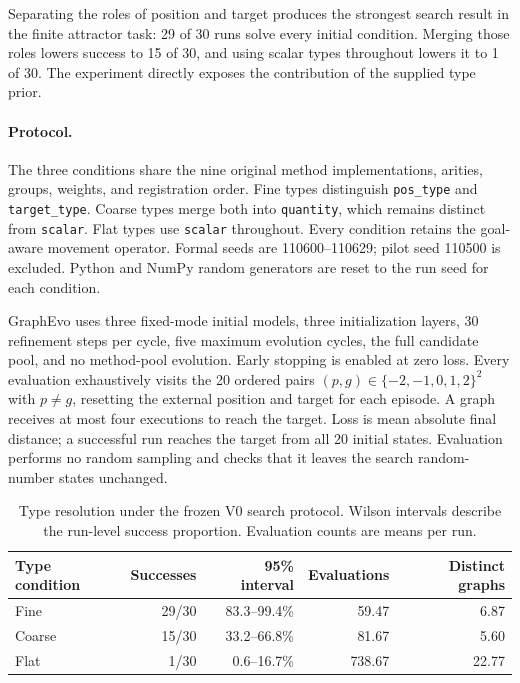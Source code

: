 Separating the roles of position and target produces the strongest search result
in the finite attractor task: 29 of 30 runs solve every initial condition.
Merging those roles lowers success to 15 of 30, and using scalar types throughout
lowers it to 1 of 30. The experiment directly exposes the contribution of the
supplied type prior.

\paragraph{Protocol.}
The three conditions share the nine original method implementations, arities,
groups, weights, and registration order. Fine types distinguish
\texttt{pos\_type} and \texttt{target\_type}. Coarse types merge both into
\texttt{quantity}, which remains distinct from \texttt{scalar}. Flat types use
\texttt{scalar} throughout. Every condition retains the goal-aware movement
operator. Formal seeds are 110600--110629; pilot seed 110500 is excluded.
Python and NumPy random generators are reset to the run seed for each condition.

GraphEvo uses three fixed-mode initial models, three initialization layers,
30 refinement steps per cycle, five maximum evolution cycles, the full
candidate pool, and no method-pool evolution. Early stopping is enabled at zero
loss. Every evaluation exhaustively visits the 20 ordered pairs
$(p,g)\in\{-2,-1,0,1,2\}^2$ with $p\ne g$, resetting the external position and
target for each episode. A graph receives at most four executions to reach the
target. Loss is mean absolute final distance; a successful run reaches the
target from all 20 initial states. Evaluation performs no random sampling and
checks that it leaves the search random-number states unchanged.

\begin{table}[tb]
\centering
\small
\caption{Type resolution under the frozen V0 search protocol. Wilson intervals
describe the run-level success proportion. Evaluation counts are means per run.}
\label{tab:revision_types_full}
\begin{tabular}{lrrrr}
\toprule
Type condition & Successes & 95\% interval & Evaluations & Distinct graphs \\
\midrule
Fine & 29/30 & 83.3--99.4\% & 59.47 & 6.87 \\
Coarse & 15/30 & 33.2--66.8\% & 81.67 & 5.60 \\
Flat & 1/30 & 0.6--16.7\% & 738.67 & 22.77 \\
\bottomrule
\end{tabular}
\end{table}

